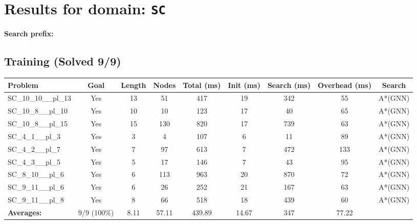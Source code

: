 \documentclass{article}
\begin{document}
\section*{Results for domain: \texttt{SC}}
\textbf{Search prefix:} 
\\[0.5cm]
\subsection*{Training (Solved 9/9)}
\begin{tabular}{lcccccccc}
\toprule
Problem & Goal & Length & Nodes & Total (ms) & Init (ms) & Search (ms) & Overhead (ms) & Search \\
\midrule
SC\_10\_10\_\_pl\_13 & Yes & 13 & 51 & 417 & 19 & 342 & 55 & A*(GNN) \\
SC\_10\_8\_\_pl\_10 & Yes & 10 & 10 & 123 & 17 & 40 & 65 & A*(GNN) \\
SC\_10\_8\_\_pl\_15 & Yes & 15 & 130 & 820 & 17 & 739 & 63 & A*(GNN) \\
SC\_4\_1\_\_pl\_3 & Yes & 3 & 4 & 107 & 6 & 11 & 89 & A*(GNN) \\
SC\_4\_2\_\_pl\_7 & Yes & 7 & 97 & 613 & 7 & 472 & 133 & A*(GNN) \\
SC\_4\_3\_\_pl\_5 & Yes & 5 & 17 & 146 & 7 & 43 & 95 & A*(GNN) \\
SC\_8\_10\_\_pl\_6 & Yes & 6 & 113 & 963 & 20 & 870 & 72 & A*(GNN) \\
SC\_9\_11\_\_pl\_6 & Yes & 6 & 26 & 252 & 21 & 167 & 63 & A*(GNN) \\
SC\_9\_11\_\_pl\_8 & Yes & 8 & 66 & 518 & 18 & 439 & 60 & A*(GNN) \\
\textbf{Averages:} & 9/9 (100\%) & 8.11 & 57.11 & 439.89 & 14.67 & 347 & 77.22 & \\
\bottomrule
\end{tabular}
\\[0.7cm]
\end{document}
